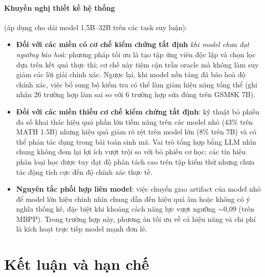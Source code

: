 \documentclass[11pt,a4paper]{article}
\begin{document}
\paragraph{Khuyến nghị thiết kế hệ thống} (áp dụng cho dải model 1,5B--32B trên các task suy luận):
\begin{itemize}\itemsep2pt
\item \textbf{Đối với các miền có cơ chế kiểm chứng tất định} \emph{khi model chưa đạt ngưỡng bão hoà}: phương pháp tối ưu là tạo tập ứng viên độc
      lập và chọn lọc dựa trên kết quả thực thi; cơ chế này tiệm cận trần oracle mà không làm suy
      giảm các lời giải chính xác. Ngược lại, khi model nền tảng đã bão hoà độ chính xác, việc bổ
      sung bộ kiểm tra có thể làm giảm hiệu năng tổng thể (ghi nhận 26 trường hợp làm sai so với
      6 trường hợp sửa đúng trên GSM8K 7B).
\item \textbf{Đối với các miền thiếu cơ chế kiểm chứng tất định}: kỹ thuật bỏ phiếu đa số khai
      thác hiệu quả phần lớn tiềm năng trên các model nhỏ (43\% trên MATH 1.5B) nhưng hiệu quả
      giảm rõ rệt trên model lớn (8\% trên 7B) và có thể phản tác dụng trong bài toán sinh
      mã. Vai trò tổng hợp bằng LLM nhìn chung không đem lại lợi ích vượt trội so với bỏ phiếu cơ
      học; các tín hiệu phân loại học được tuy đạt độ phân tách cao trên tập kiểm thử nhưng chưa
      tác động tích cực đến độ chính xác thực tế.
\item \textbf{Nguyên tắc phối hợp liên model}: việc chuyển giao artifact của model nhỏ để model
      lớn hiệu chỉnh nhìn chung dẫn đến hiệu quả âm hoặc không có ý nghĩa thống kê, đặc biệt khi
      khoảng cách năng lực vượt ngưỡng $\sim$0,09 (trên MBPP). Trong trường hợp này, phương án tối
      ưu về cả hiệu năng và chi phí là kích hoạt trực tiếp model mạnh đơn lẻ.
\end{itemize}

\section{Kết luận và hạn chế}\label{sec:limits}
\end{document}
